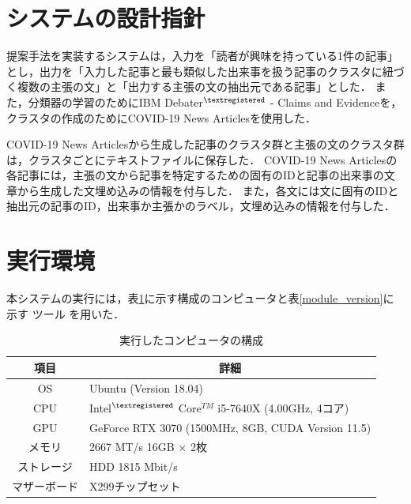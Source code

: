 \documentclass[12pt,a4j]{jreport}
\begin{document}
\section{システムの設計指針}
\label{section_system_plan}
提案手法を実装するシステムは，入力を「読者が興味を持っている1件の記事」とし，出力を「入力した記事と最も類似した出来事を扱う記事のクラスタに紐づく複数の主張の文」と「出力する主張の文の抽出元である記事」とした．
また，分類器の学習のためにIBM Debater$^{\textregistered}$ - Claims and Evidenceを，クラスタの作成のためにCOVID-19 News Articlesを使用した．

COVID-19 News Articlesから生成した記事のクラスタ群と主張の文のクラスタ群は，クラスタごとにテキストファイルに保存した．
COVID-19 News Articlesの各記事には，主張の文から記事を特定するための固有のIDと記事の出来事の文章から生成した文埋め込みの情報を付与した．
また，各文には文に固有のIDと抽出元の記事のID，出来事か主張かのラベル，文埋め込みの情報を付与した．



\section{実行環境}
\label{section_environment}
本システムの実行には，表\ref{pc_spec}に示す構成のコンピュータと表\ref{module_version}に示す
ツール
を用いた．

\begin{table}[H]
  \caption{実行したコンピュータの構成}
  \centering
  \vspace{4mm}
  \begin{tabular}{cl}
    \hline
    項目 & \multicolumn{1}{c}{詳細} \\
    \hline
    OS & Ubuntu (Version 18.04) \\
    CPU & Intel$^{\textregistered}$ Core$^{TM}$ i5-7640X (4.00GHz, 4コア) \\
    GPU & GeForce RTX 3070 (1500MHz, 8GB,
    CUDA Version 11.5) \\
    メモリ & 2667 MT/s 16GB $\times$ 2枚 \\
    ストレージ & HDD 1815 Mbit/s \\
    マザーボード & X299チップセット \\
    \hline
    \end{tabular}
  \label{pc_spec}
\end{table}
\end{document}
